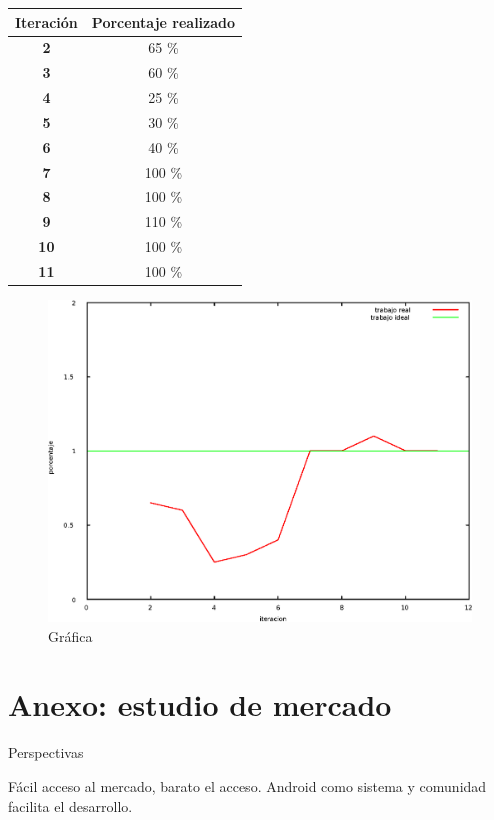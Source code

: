 \documentclass[12 pt, a4paper, twoside]{article}
\begin{document}
\begin{table}[!ht]
\begin{center}
    \begin{tabular}[!ht]{|c||c|} \hline
      \textbf{Iteración} & \textbf{Porcentaje realizado} \\ \hline
      \textbf{2} & 65 \% \\ \hline
      \textbf{3} & 60 \% \\ \hline
      \textbf{4} & 25 \% \\ \hline
      \textbf{5} & 30 \% \\ \hline
      \textbf{6} & 40 \% \\ \hline
      \textbf{7} & 100 \% \\ \hline
      \textbf{8} & 100 \% \\ \hline
      \textbf{9} & 110 \% \\ \hline
      \textbf{10} & 100 \% \\ \hline
      \textbf{11} & 100 \% \\ \hline
    \end{tabular}
\end{center}
\end{table}


\begin{figure}[h]
\centering
\includegraphics[width = 10 cm]{grafica.eps}
\caption{Gráfica}
\end{figure}


\section{Anexo: estudio de mercado}
Perspectivas

Fácil acceso al mercado, barato el acceso. Android como sistema y
comunidad facilita el desarrollo.
\end{document}

